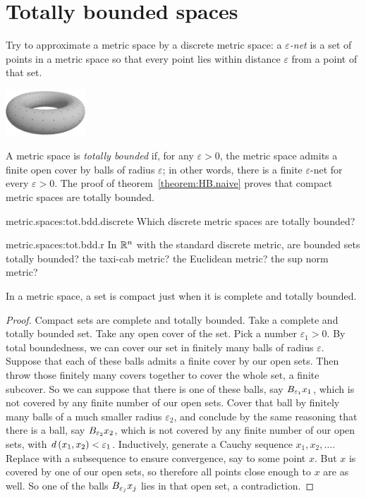 \section{Totally bounded spaces}
Try to approximate a metric space by a discrete metric space: a \emph{\(\varepsilon\)-net} is a set of points in a metric space so that every point lies within distance \(\varepsilon\) from a point of that set.
\begin{center}
\includegraphics[width=3cm]{torus-with-net}
\end{center}
\par\noindent{}A metric space is \emph{totally bounded} if, for any \(\varepsilon > 0\), the metric space admits a finite open cover by balls of radius \(\varepsilon\); in other words, there is a finite \(\varepsilon\)-net for every \(\varepsilon>0\).
The proof of theorem~\vref{theorem:HB.naive} proves that compact metric spaces are totally bounded.
\begin{problem}{metric.spaces:tot.bdd.discrete}
Which discrete metric spaces are totally bounded?
\end{problem}
\begin{problem}{metric.spaces:tot.bdd.r}
In \(\mathbb{R}^{n}\) with the standard discrete metric, are bounded sets totally bounded? the taxi-cab metric? the Euclidean metric? the sup norm metric?
\end{problem}
\begin{theorem}\label{theorem:h.b}
In a metric space, a set is compact just when it is complete and totally bounded.
\end{theorem}
\begin{proof}
Compact sets are complete and totally bounded.
Take a complete and totally bounded set.
Take any open cover of the set.
Pick a number \(\varepsilon_1 > 0\).
By total boundedness, we can cover our set in finitely many balls of radius \(\varepsilon\).
Suppose that each of these balls admits a finite cover by our open sets.
Then throw those finitely many covers together to cover the whole set, a finite subcover.
So we can suppose that there is one of these balls, say \(\ball{\varepsilon_1}{x_1}\), which is not covered by any finite number of our open sets.
Cover that ball by finitely many balls of a much smaller radius \(\varepsilon_2\), and conclude by the same reasoning that there is a ball, say \(\ball{\varepsilon_2}{x_2}\), which is not covered by any finite number of our open sets, with \(d\left(x_1,x_2\right)<\varepsilon_1\).
Inductively, generate a Cauchy sequence \(x_1, x_2, \dots\).
Replace with a subsequence to ensure convergence, say to some point \(x\).
But \(x\) is covered by one of our open sets, so therefore all points close enough to \(x\) are as well.
So one of the balls \(\ball{\varepsilon_j}{x_j}\) lies in that open set, a contradiction.
\end{proof}
